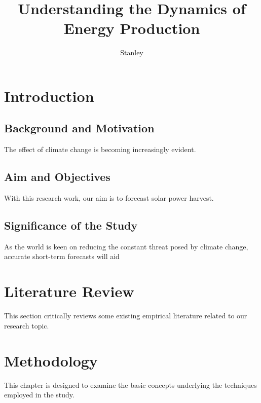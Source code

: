 \documentclass[10pt,a4paper]{article}
\author{Stanley}
\title{Understanding the Dynamics of Energy Production}
\begin{document}
\maketitle
%
\section{Introduction}
\subsection{Background and Motivation}
The effect of climate change is becoming increasingly evident.
\subsection{Aim and Objectives}
With this research work, our aim is to forecast solar power harvest.
\subsection{Significance of the Study}
As the world is keen on reducing the constant threat posed by climate change, accurate short-term forecasts
will aid
\section{Literature Review}
This section critically reviews some existing empirical literature related to our research topic.
\section{Methodology}
This chapter is designed to examine the basic concepts underlying the techniques employed in the study.
\end{document}
